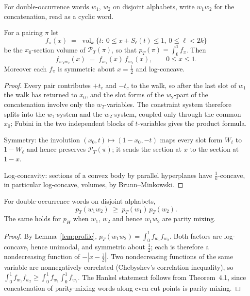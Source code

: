 For double-occurrence words $w_1$, $w_2$ on disjoint alphabets, write
$w_1w_2$ for the concatenation, read as a cyclic word.

\begin{lemma}\label{lem:profile}
For a pairing $\pi$ let
\[
f_\pi(x)\;=\;\operatorname{vol}_k\{t:\ 0\le x+S_\ell(t)\le 1,\ 0\le\ell<2k\}
\]
be the $x_0$-section volume of $\mathcal P_T(\pi)$, so that
$p_T(\pi)=\int_0^1 f_\pi$.  Then
\[
f_{w_1w_2}(x)\;=\;f_{w_1}(x)\,f_{w_2}(x),\qquad 0\le x\le1 .
\]
Moreover each $f_\pi$ is symmetric about $x=\tfrac12$ and log-concave.
\end{lemma}

\begin{proof}
Every pair contributes $+t_c$ and $-t_c$ to the walk, so after the last
slot of $w_1$ the walk has returned to $x_0$, and the slot forms of the
$w_2$-part of the concatenation involve only the $w_2$-variables.  The
constraint system therefore splits into the $w_1$-system and the
$w_2$-system, coupled only through the common $x_0$; Fubini in the two
independent blocks of $t$-variables gives the product formula.

Symmetry: the involution $(x_0,t)\mapsto(1-x_0,-t)$ maps every slot form
$W_\ell$ to $1-W_\ell$ and hence preserves $\mathcal P_T(\pi)$; it sends
the section at $x$ to the section at $1-x$.

Log-concavity: sections of a convex body by parallel hyperplanes have
$\frac1k$-concave, in particular log-concave, volumes, by
Brunn--Minkowski.
\end{proof}

\begin{lemma}[Supermultiplicativity]\label{lem:super}
For double-occurrence words on disjoint alphabets,
\[
p_T(w_1w_2)\;\ge\;p_T(w_1)\,p_T(w_2).
\]
The same holds for $p_H$ when $w_1$, $w_2$ and hence $w_1w_2$ are parity
mixing.
\end{lemma}

\begin{proof}
By Lemma~\ref{lem:profile}, $p_T(w_1w_2)=\int_0^1 f_{w_1}f_{w_2}$.  Both
factors are log-concave, hence unimodal, and symmetric about $\tfrac12$;
each is therefore a nondecreasing function of $-|x-\tfrac12|$.  Two
nondecreasing functions of the same variable are nonnegatively correlated
(Chebyshev's correlation inequality), so
$\int_0^1 f_{w_1}f_{w_2}\ge\int_0^1 f_{w_1}\int_0^1 f_{w_2}$.
The Hankel statement follows from Theorem~4.1, since concatenation of
parity-mixing words along even cut points is parity mixing.
\end{proof}


